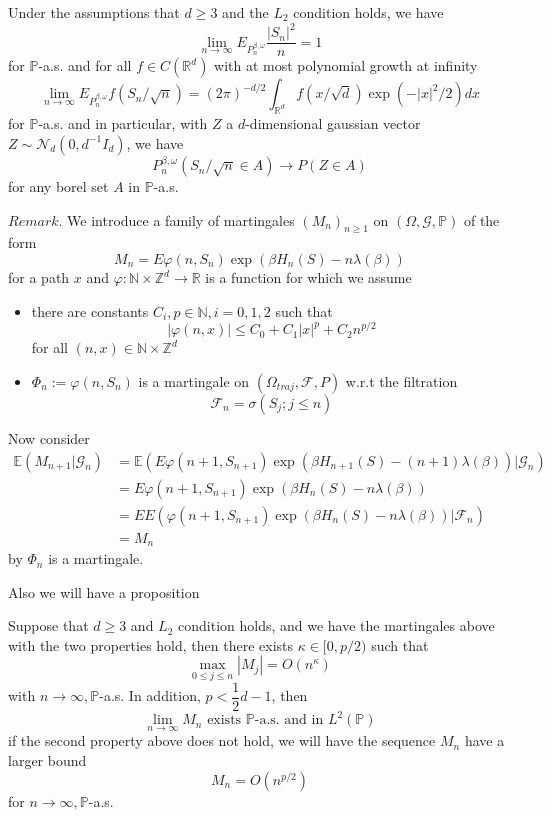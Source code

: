 \begin{theorem}
    Under the assumptions that $d\geq 3$ and the $L_2$ condition holds, we have
    \[
    \lim\limits_{n\to\infty} E_{P^{\beta,\omega}_n} \dfrac{|S_n|^2}{n} = 1
    \]
    for $\mathbb{P}$-a.s. and for all $f\in C(\mathbb{R}^d)$ with at most polynomial growth at infinity
    \[
    \lim\limits_{n\to\infty} E_{P^{\beta,\omega}_n} f(S_n/\sqrt{n}) = (2\pi)^{-d/2} \int_{\mathbb{R}^d} f(x/\sqrt{d})\exp(-|x|^2/2) dx
    \]
    for $\mathbb{P}$-a.s. and in particular, with $Z$ a $d$-dimensional gaussian vector $Z\sim \mathcal{N}_d(0,d^{-1}I_d)$, we have
    \[
    P^{\beta,\omega}_n(S_n/\sqrt{n} \in A) \to P(Z\in A)
    \]
    for any borel set $A$ in $\mathbb{P}$-a.s.
\end{theorem}

$Remark.$ We introduce a family of martingales $(M_n)_{n\geq 1}$ on $(\Omega,\mathcal{G},\mathbb{P})$ of the form
\[M_n = E \varphi(n,S_n)\exp(\beta H_n(S)-n\lambda(\beta))\]
for a path $x$ and $\varphi: \mathbb{N}\times \mathbb{Z}^d \to\mathbb{R}$ is a function for which we assume
\begin{itemize}
    \item there are constants $C_i, p\in\mathbb{N},i=0,1,2$ such that
    \[|\varphi(n,x)| \leq C_0 + C_1|x|^p + C_2 n^{p/2}\]
    for all $(n,x)\in\mathbb{N}\times \mathbb{Z}^d$
    \item $\Phi_n := \varphi(n,S_n)$ is a martingale on $(\Omega_{traj},\mathcal{F},P)$ w.r.t the filtration
    \[\mathcal{F}_n = \sigma(S_j;j\leq n)\]
\end{itemize}
Now consider
\[
\begin{aligned}
    \mathbb{E}(M_{n+1}|\mathcal{G}_n) &= \mathbb{E}(E\varphi(n+1,S_{n+1})\exp(\beta H_{n+1}(S) - {(n+1)}\lambda(\beta))|\mathcal{G}_n) \\
    &= E\varphi(n+1,S_{n+1})\exp(\beta H_n(S)-n\lambda(\beta)) \\
    &= EE(\varphi(n+1,S_{n+1})\exp(\beta H_n(S)-n\lambda(\beta))|\mathcal{F}_n) \\
    &= M_n
\end{aligned}
\]
by $\Phi_n$ is a martingale.\par
Also we will have a proposition
\begin{proposition}
    Suppose that $d\geq 3$ and $L_2$ condition holds, and we have the martingales above with the two properties hold, then there exists $\kappa \in [0,p/2)$ such that
    \[
    \max_{0\leq j\leq n}|M_j| = O(n^{\kappa})
    \]
    with $n\to\infty, \mathbb{P}$-a.s. In addition, $p < \dfrac{1}{2}d-1$, then
    \[
    \lim\limits_{n\to\infty} M_n\text{ exists }\mathbb{P}\text{-a.s. and in }L^2(\mathbb{P}) 
    \]
    if the second property above does not hold, we will have the sequence $M_n$ have a larger bound
    \[
    M_n = O(n^{p/2})
    \]
    for $n\to\infty, \mathbb{P}$-a.s.
\end{proposition}

